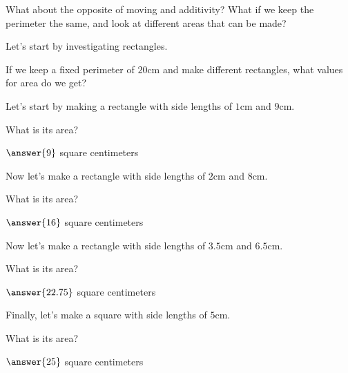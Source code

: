 \documentclass{ximera}
\begin{document}
What about the opposite of moving and additivity? What if we keep the perimeter the same, and look at different areas that can be made?

Let's start by investigating rectangles.
\begin{question}
If we keep a fixed perimeter of $20$cm and make different rectangles, what values for area do we get?

Let's start by making a rectangle with side lengths of $1$cm and $9$cm.
\begin{image}
\end{image}
What is its area? \begin{prompt} $\answer{9}$ square centimeters \end{prompt}

Now let's make a rectangle with side lengths of $2$cm and $8$cm.
\begin{image}
\end{image}
What is its area? \begin{prompt} $\answer{16}$ square centimeters \end{prompt}

Now let's make a rectangle with side lengths of $3.5$cm and $6.5$cm.
\begin{image}
\end{image}
What is its area? \begin{prompt} $\answer{22.75}$ square centimeters \end{prompt}

Finally, let's make a square with side lengths of $5$cm.
\begin{image}
\end{image}
What is its area? \begin{prompt} $\answer{25}$ square centimeters \end{prompt}

\end{question}
\end{document}
